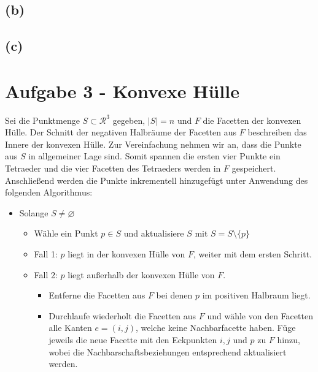 \documentclass[a4paper]{article}
\begin{document}
\subsection*{(b)}
\begin{figure}[!htb]
\end{figure} 

\subsection*{(c)}

\section*{Aufgabe 3 - Konvexe Hülle}

Sei die Punktmenge $S \subset \mathcal{R}^3$ gegeben, $|S| = n$ und $F$ die Facetten der konvexen Hülle. Der Schnitt der negativen Halbräume der Facetten aus $F$ beschreiben das Innere der konvexen Hülle. 
Zur Vereinfachung nehmen wir an, dass die Punkte aus $S$ in allgemeiner Lage sind. Somit spannen die ersten vier Punkte ein Tetraeder und die vier Facetten des Tetraeders werden in $F$ gespeichert. Anschließend werden die Punkte inkrementell hinzugefügt unter Anwendung des folgenden Algorithmus:

\begin{itemize}
	\item Solange $S \neq \varnothing$
	\begin{itemize}	
		\item Wähle ein Punkt $p \in S$ und aktualisiere $S$ mit $S = S \setminus \{p\}$
		\item Fall 1: $p$ liegt in der konvexen Hülle von $F$, weiter mit dem ersten Schritt.
		\item Fall 2: $p$ liegt außerhalb der konvexen Hülle von $F$.
	\begin{itemize}
		\item Entferne die Facetten aus $F$ bei denen $p$ im positiven Halbraum liegt.
		\item Durchlaufe wiederholt die Facetten aus $F$ und wähle von den Facetten alle Kanten $ e = (i,j) $, welche keine Nachbarfacette haben.
		Füge jeweils die neue Facette mit den Eckpunkten $i,j$ und $p$ zu $F$ hinzu, wobei die Nachbarschaftsbeziehungen entsprechend aktualisiert werden. 
	\end{itemize}
	\end{itemize}
\end{itemize}
\end{document}

